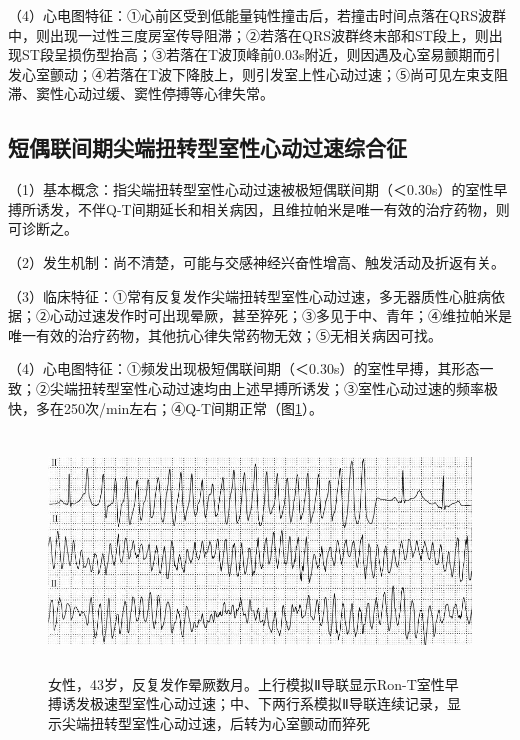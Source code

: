 （4）心电图特征：①心前区受到低能量钝性撞击后，若撞击时间点落在QRS波群中，则出现一过性三度房室传导阻滞；②若落在QRS波群终末部和ST段上，则出现ST段呈损伤型抬高；③若落在T波顶峰前0.03s附近，则因遇及心室易颤期而引发心室颤动；④若落在T波下降肢上，则引发室上性心动过速；⑤尚可见左束支阻滞、窦性心动过缓、窦性停搏等心律失常。

\protect\hypertarget{text00047.htmlux5cux23subid576}{}{}

\subsection{短偶联间期尖端扭转型室性心动过速综合征}

（1）基本概念：指尖端扭转型室性心动过速被极短偶联间期（＜0.30s）的室性早搏所诱发，不伴Q-T间期延长和相关病因，且维拉帕米是唯一有效的治疗药物，则可诊断之。

（2）发生机制：尚不清楚，可能与交感神经兴奋性增高、触发活动及折返有关。

（3）临床特征：①常有反复发作尖端扭转型室性心动过速，多无器质性心脏病依据；②心动过速发作时可出现晕厥，甚至猝死；③多见于中、青年；④维拉帕米是唯一有效的治疗药物，其他抗心律失常药物无效；⑤无相关病因可找。

（4）心电图特征：①频发出现极短偶联间期（＜0.30s）的室性早搏，其形态一致；②尖端扭转型室性心动过速均由上述早搏所诱发；③室性心动过速的频率极快，多在250次/min左右；④Q-T间期正常（图\ref{fig40-18}）。

\begin{figure}[!htbp]
 \centering
 \includegraphics[width=5.58333in,height=2.47917in]{./images/Image00680.jpg}
 \captionsetup{justification=centering}
 \caption{女性，43岁，反复发作晕厥数月。上行模拟Ⅱ导联显示Ron-T室性早搏诱发极速型室性心动过速；中、下两行系模拟Ⅱ导联连续记录，显示尖端扭转型室性心动过速，后转为心室颤动而猝死}
 \label{fig40-18}
  \end{figure} 

\protect\hypertarget{text00047.htmlux5cux23subid577}{}{}

